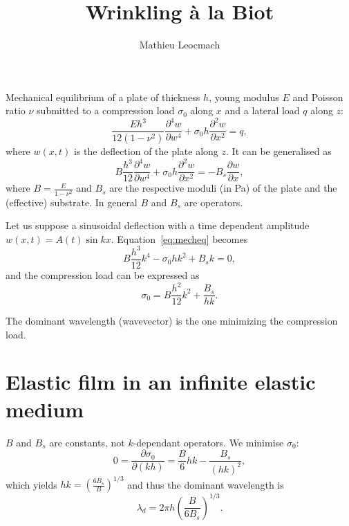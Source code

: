\documentclass[12pt,a4paper]{revtex4}
\begin{document}
\author{Mathieu Leocmach}
\title{Wrinkling à la Biot}
\maketitle

Mechanical equilibrium of a plate of thickness $h$, young modulus $E$ and Poisson ratio $\nu$ submitted to a compression load $\sigma_0$ along $x$ and a lateral load $q$ along $z$:
\begin{equation}
\frac{E h^3}{12(1-\nu^2)}\frac{\partial^4 w}{\partial w^4} + \sigma_0 h \frac{\partial^2 w}{\partial x^2} = q,
\end{equation}
where $w(x,t)$ is the deflection of the plate along $z$. It can be generalised as
\begin{equation}
B\frac{h^3}{12}\frac{\partial^4 w}{\partial w^4} + \sigma_0 h \frac{\partial^2 w}{\partial x^2} = -B_s \frac{\partial w}{\partial x},
\label{eq:mecheq}
\end{equation}
where $B=\frac{E}{1-\nu^2}$ and $B_s$ are the respective moduli (in \si{\pascal}) of the plate and the (effective) substrate. In general $B$ and $B_s$ are operators.

Let us suppose a sinusoidal deflection with a time dependent amplitude $w(x,t) = A(t) \sin kx$. Equation~\ref{eq:mecheq} becomes
\begin{equation}
B\frac{h^3}{12}k^4 - \sigma_0 h k^2 + B_s k =0,
\end{equation}
and the compression load can be expressed as
\begin{equation}
\sigma_0 = B \frac{h^2}{12} k^2 + \frac{B_s}{hk}.
\label{eq:sigma0}
\end{equation}

The dominant wavelength (wavevector) is the one minimizing the compression load.

\section{Elastic film in an infinite elastic medium}

$B$ and $B_s$ are constants, not $k$-dependant operators. We minimise $\sigma_0$:
\begin{equation}
0 = \frac{\partial \sigma_0}{\partial (kh)} = \frac{B}{6} hk -  \frac{B_s}{(hk)^2},
\end{equation}
which yields $hk = \left(\frac{6B_s}{B}\right)^{1/3}$ and thus the dominant wavelength is
\begin{equation}
\lambda_d = 2\pi h \left(\frac{B}{6B_s}\right)^{1/3}.
\label{eq:lambdaElEl}
\end{equation}
\end{document}
